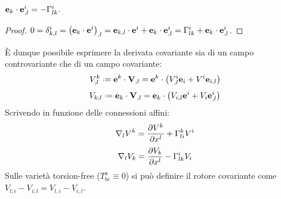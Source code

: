 \begin{proposition}
	$ \mathbf{e}_k \cdot \mathbf{e}^i_{,l} = - \Gamma^i_{lk} $.
\end{proposition}
\begin{proof}
	$ 0 = \delta^i_{k,l} = \left( \mathbf{e}_k \cdot \mathbf{e}^i \right)_{,l} = \mathbf{e}_{k,l} \cdot \mathbf{e}^i + \mathbf{e}_k \cdot \mathbf{e}^i_{,l} = \Gamma^i_{lk} + \mathbf{e}_k \cdot \mathbf{e}^i_{,l} $.
\end{proof}
È dunque possibile esprimere la derivata covariante sia di un campo controvariante che di un campo covariante:
\begin{equation}
	V^k_{;l} \defeq \ve{e}^k \cdot \ve{V}_{,l} = \ve{e}^k \cdot \left( V^i_{,l} \ve{e}_i + V^i \ve{e}_{i,l} \right)
	\label{eq:4.8}
\end{equation}
\begin{equation}
	V_{k;l} \defeq \ve{e}_k \cdot \ve{V}_{,l} = \ve{e}_k \cdot \left( V_{i,l} \ve{e}^i + V_i \ve{e}^i_{,l} \right)
	\label{eq:4.9}
\end{equation}
Scrivendo in funzione delle connessioni affini:
\begin{equation}
	\nabla_l V^k = \frac{\partial V^k}{\partial x^l} + \Gamma^k_{li} V^i
	\label{eq:4.10}
\end{equation}
\begin{equation}
	\nabla_l V_k = \frac{\partial V_k}{\partial x^l} - \Gamma^i_{lk} V_i
	\label{eq:4.11}
\end{equation}
Sulle varietà torsion-free ($ T^a_{bc} \equiv 0 $) si può definire il rotore covariante come $ V_{l;i} - V_{i;l} = V_{l,i} - V_{i,l} $.










